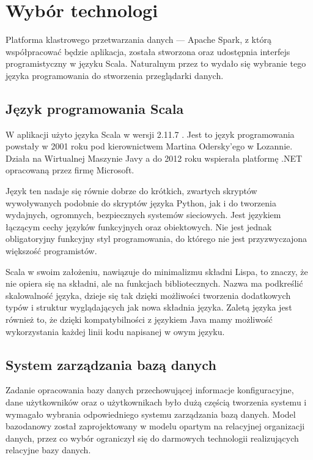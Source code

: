 \documentclass[a4paper,12pt,twoside]{article}
\begin{document}
\newpage
\section{Wybór technologi}

Platforma klastrowego przetwarzania danych — Apache Spark\cite{spark}, z którą współpracować będzie aplikacja, została stworzona oraz udostępnia interfejs programistyczny w języku Scala.
Naturalnym przez to wydało się wybranie tego języka programowania do stworzenia przeglądarki danych.

\subsection{Język programowania Scala}
W aplikacji użyto języka Scala w wersji 2.11.7 \cite{jezykScala}. Jest to język programowania powstały w 2001 roku pod kierownictwem Martina Odersky'ego w Lozannie.
Działa na Wirtualnej Maszynie Javy a do 2012 roku wspierała platformę .NET opracowaną przez firmę Microsoft.

Język ten nadaje się równie dobrze do krótkich, zwartych skryptów wywoływanych podobnie do skryptów języka Python, jak i do tworzenia wydajnych, ogromnych, bezpiecznych systemów sieciowych.
Jest językiem łączącym cechy języków funkcyjnych oraz obiektowych.
Nie jest jednak obligatoryjny funkcyjny styl programowania, do którego nie jest przyzwyczajona większość programistów.

Scala w swoim założeniu, nawiązuje do minimalizmu składni Lispa, to znaczy, że nie opiera się na składni, ale na funkcjach bibliotecznych. Nazwa ma podkreślić skalowalność języka, dzieje się tak dzięki możliwości tworzenia dodatkowych typów i struktur wyglądających jak nowa składnia języka.
Zaletą języka jest również to, że dzięki kompatybilności z językiem Java mamy możliwość wykorzystania każdej linii kodu napisanej w owym języku.

\subsection{System zarządzania bazą danych}
Zadanie opracowania bazy danych przechowującej informacje konfiguracyjne, dane użytkowników oraz o użytkownikach było dużą częścią tworzenia systemu i
wymagało wybrania odpowiedniego systemu zarządzania bazą danych.
Model bazodanowy został zaprojektowany w modelu opartym na relacyjnej organizacji danych, przez co wybór ograniczył się do
darmowych technologii realizujących relacyjne bazy danych.
\end{document}
